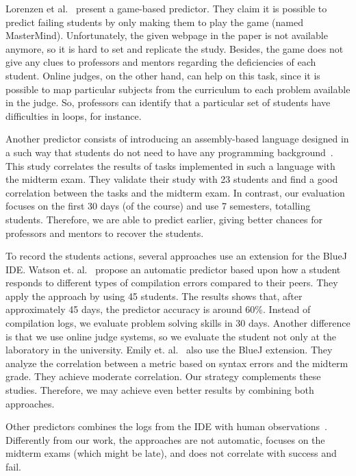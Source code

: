 Lorenzen et al.~\cite{lorenzenC06-mastermind-predictor-sigcse2008} present a game-based predictor. They claim it is possible to predict failing students by only making them to play the game (named MasterMind). Unfortunately, the given webpage in the paper is not available anymore, so it is hard to set and replicate the study. Besides, the game does not give any clues to professors and mentors regarding the deficiencies of each student. Online judges, on the other hand, can help on this task, since it is possible to map particular subjects from the curriculum to each problem available in the judge. So, professors can identify that a particular set of students have difficulties in loops, for instance.

Another predictor consists of introducing an assembly-based language designed in a such way that students do not need to have any programming background~\cite{harris-assembly-jcsc2014}. This study correlates the results of tasks implemented in such a language with the midterm exam. They validate their study with 23 students and find a good correlation between the tasks and the midterm exam. In contrast, our evaluation focuses on the first 30 days (\semesterPercentage of the course) and use 7 semesters, totalling \totalStudents students. Therefore, we are able to predict earlier, giving better chances for professors and mentors to recover the students.


To record the students actions, several approaches use an extension for the BlueJ IDE. Watson et. al.~\cite{watson-icalt-2013} propose an automatic predictor based upon how a student responds to different types of compilation errors compared to their peers. They apply the approach by using 45 students. The results shows that, after approximately 45 days, the predictor accuracy is around 60\%. Instead of compilation logs, we evaluate problem solving skills in 30 days. Another difference is that we use online judge systems, so we evaluate the student not only at the laboratory in the university.  Emily et. al.~\cite{emily-up-2008, emily-icer-2011} also use the BlueJ extension. They analyze the correlation between a metric based on syntax errors and the midterm grade. They achieve moderate correlation. Our strategy complements these studies. Therefore, we may achieve even better results by combining both approaches.

Other predictors combines the logs from the IDE with human observations~\cite{diane-acii-2011, rodrigo-behavioral-ITiCSE2009}. Differently from our work, the approaches are not automatic, focuses on the midterm exams (which might be late), and does not correlate with success and fail.


